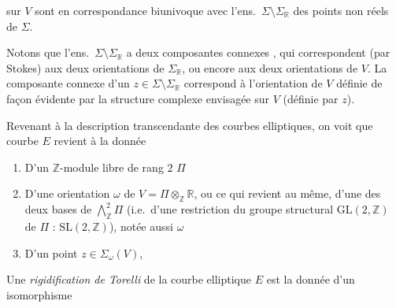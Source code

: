 \documentclass[11pt,a4paper]{article}
\begin{document}
sur $V$ sont en correspondance biunivoque avec l'ens.\ $\Sigma \setminus \Sigma_{\mathbb{R}}$
des points non réels de $\Sigma$.

Notons que l'ens.\ $\Sigma \setminus \Sigma_{\mathbb{R}}$ a deux composantes connexes
\add{$\Sigma^*_\omega$}, qui correspondent (par Stokes) aux deux orientations de
$\Sigma_{\mathbb{R}}$, ou encore aux deux orientations de $V$. La composante connexe d'un
$z \in \Sigma \setminus \Sigma_{\mathbb{R}}$ correspond à l'orientation de $V$ définie de
façon évidente par la structure complexe envisagée sur $V$ (définie par $z$).

Revenant à la description transcendante des courbes elliptiques, on voit que
  courbe $E$ revient à la donnée
\begin{enumerate}
  \item[a)] D'un $\mathbb{Z}$-module libre de rang $2$ $\Pi$
  \item[b)] D'une  orientation $\omega$ de $V = \Pi \otimes_{\mathbb{Z}} \mathbb{R}$,
    ou ce qui revient au même, d'une des deux bases de $\bigwedge^2_{\mathbb{Z}} \Pi$ (i.e.\ d'une
    restriction du groupe structural $\mathrm{GL}(2, \mathbb{Z})$ de $\Pi$ : $\mathrm{SL}(2, \mathbb{Z})$),
     notée aussi $\omega$
  \item[c)] D'un point $z \in \Sigma_\omega(V)$,
\end{enumerate}

Une \emph{rigidification de Torelli} de la courbe elliptique $E$ est la donnée d'un
isomorphisme
\end{document}
